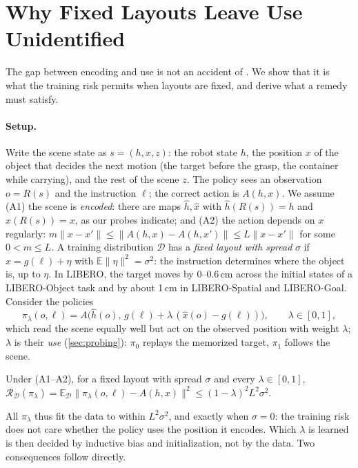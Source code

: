 \section{Why Fixed Layouts Leave Use Unidentified}
\label{sec:theory}

The gap between encoding and use is not an accident of \pizf.
We show that it is what the training risk permits when layouts are fixed, and derive what a remedy must satisfy.

\paragraph{Setup.}
Write the scene state as $s=(h,x,z)$: the robot state $h$, the position $x$ of the object that decides the next motion
(the target before the grasp, the container while carrying), and the rest of the scene $z$.
The policy sees an observation $o=R(s)$ and the instruction $\ell$; the correct action is $A(h,x)$.
We assume (A1) the scene is \emph{encoded}: there are maps $\hat h,\hat x$ with $\hat h(R(s))=h$ and $\hat x(R(s))=x$, as
our probes indicate; and (A2) the action depends on $x$ regularly: $m\lVert x-x'\rVert\le\lVert A(h,x)-A(h,x')\rVert\le
L\lVert x-x'\rVert$ for some $0<m\le L$.
A training distribution $\mathcal{D}$ has a \emph{fixed layout with spread} $\sigma$ if $x=g(\ell)+\eta$ with
$\mathbb{E}\lVert\eta\rVert^2=\sigma^2$: the instruction determines where the object is, up to $\eta$.
In LIBERO, the target moves by 0--0.6\,cm across the initial states of a LIBERO-Object task and by about 1\,cm in
LIBERO-Spatial and LIBERO-Goal.
Consider the policies
\begin{equation}
\pi_\lambda(o,\ell)=A\big(\hat h(o),\, g(\ell)+\lambda\,(\hat x(o)-g(\ell))\big),\qquad \lambda\in[0,1],
\end{equation}
which read the scene equally well but act on the observed position with weight $\lambda$; $\lambda$ is their \emph{use}
(\cref{sec:probing}): $\pi_0$ replays the memorized target, $\pi_1$ follows the scene.

\begin{proposition}
\label{prop:unidentified}
Under (A1--A2), for a fixed layout with spread $\sigma$ and every $\lambda\in[0,1]$,
$\mathcal{R}_{\mathcal{D}}(\pi_\lambda)=\mathbb{E}_{\mathcal{D}}\lVert\pi_\lambda(o,\ell)-A(h,x)\rVert^2\le(1-\lambda)^2L^2\sigma^2$.
\end{proposition}

All $\pi_\lambda$ thus fit the data to within $L^2\sigma^2$, and exactly when $\sigma=0$: the training risk does not care
whether the policy uses the position it encodes.
Which $\lambda$ is learned is then decided by inductive bias and initialization, not by the data.
Two consequences follow directly.

